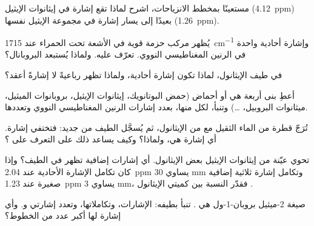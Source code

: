 \begin{exercise}[$\star\star$]\label{exo:g12:proton-nmr:9}
مستعينًا بمخطط الانزياحات، اشرح لماذا تقع إشارة  في إيثانوات الإيثيل
(\qty{4.12}{ppm}) بعيدًا إلى يسار إشارة  في مجموعة الإيثيل
نفسها (\qty{1.26}{ppm}).
\end{exercise}

\begin{exercise}[$\star\star$]\label{exo:g12:proton-nmr:10}
يُظهر مركب  حزمة قوية في الأشعة تحت الحمراء عند
\qty{1715}{cm^{-1}} وإشارة أحادية واحدة في الرنين المغناطيسي النووي. تعرّف عليه. ولماذا
يُستبعد البروبانال؟
\end{exercise}

\begin{exercise}[$\star\star$]\label{exo:g12:proton-nmr:11}
في طيف الإيثانول، لماذا تكون إشارة  أحادية، ولماذا
تظهر  رباعيةً لا إشارةً
أعقد؟
\end{exercise}

\begin{exercise}[$\star\star\star$]\label{exo:g12:proton-nmr:12}
أعطِ بنى أربعة   هي  أو أحماض
(حمض البوتانويك، إيثانوات الإيثيل، بروبانوات الميثيل، ميثانوات البروبيل،
\dots) وتنبأ، لكل منها، بعدد إشارات الرنين المغناطيسي النووي
وتعددها.
\end{exercise}

\begin{exercise}[$\star\star\star$]\label{exo:g12:proton-nmr:13}
تُرَجّ قطرة من الماء الثقيل  مع  من الإيثانول، ثم
يُسجَّل الطيف من جديد: فتختفي إشارة. أي إشارة هي، ولماذا؟
وكيف يساعد ذلك على التعرف على  ؟
\end{exercise}

\begin{exercise}[$\star\star\star$]\label{exo:g12:proton-nmr:14}
تحوي عيّنة من إيثانوات الإيثيل بعض الإيثانول. أي إشارات إضافية
تظهر في الطيف؟ وإذا كان تكامل الإشارة الأحادية عند
\qty{2.04}{ppm} يساوي 30 mm وتكامل إشارة ثلاثية إضافية صغيرة عند
\qty{1.23}{ppm} يساوي 3 mm، فقدّر النسبة بين كميتي الإيثانول
.
\end{exercise}

\begin{exercise}[$\star\star\star$]\label{exo:g12:proton-nmr:15}
صيغة 2-ميثيل بروبان-1-ول هي . تنبأ بطيفه:
الإشارات، وتكاملاتها، وتعدد إشارتي 
و. وأي إشارة لها أكبر عدد من الخطوط؟
\end{exercise}

